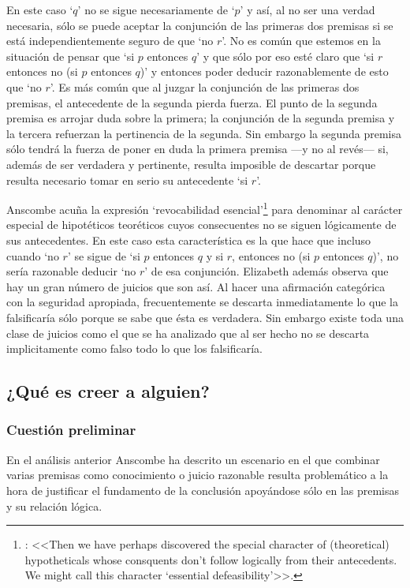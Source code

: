   En este caso `$q$' no se sigue necesariamente de `$p$' y así, al no ser una
  verdad necesaria, sólo se puede aceptar la conjunción de las primeras dos
  premisas si se está independientemente seguro de que `no $r$'. No es común que
  estemos en la situación de pensar que `si $p$ entonces $q$' y que sólo por eso
  esté claro que `si $r$ entonces no (si $p$ entonces $q$)' y entonces poder
  deducir razonablemente de esto que `no $r$'. Es más común que al juzgar la
  conjunción de las primeras dos premisas, el antecedente de la segunda pierda
  fuerza. El punto de la segunda premisa es arrojar duda sobre la primera; la
  conjunción de la segunda premisa y la tercera refuerzan la pertinencia de la
  segunda. Sin embargo la segunda premisa sólo tendrá la fuerza de poner en duda
  la primera premisa ---y no al revés--- si, además de ser verdadera y
  pertinente, resulta imposible de descartar porque resulta necesario tomar en
  serio su antecedente `si $r$'\autocite[Cf.~][301]{anscombe2015logic:qpa}.

  Anscombe acuña la expresión `revocabilidad
  esencial'\footnote{\cite[Cf.~][301]{anscombe2015logic:qpa}: <<Then we have
    perhaps discovered the special character of (theoretical) hypotheticals
    whose consquents don't follow logically from their antecedents. We might
    call this character `essential defeasibility'>>.} para denominar al carácter
  especial de hipotéticos teoréticos cuyos consecuentes no se siguen lógicamente
  de sus antecedentes. En este caso esta característica es la que hace que
  incluso cuando `no $r$' se sigue de `si $p$ entonces $q$ y si $r$, entonces no
  (si $p$ entonces $q$)', no sería razonable deducir `no $r$' de esa conjunción.
  Elizabeth además observa que hay un gran número de juicios que son así. Al
  hacer una afirmación categórica con la seguridad apropiada, frecuentemente se
  descarta inmediatamente lo que la falsificaría sólo porque se sabe que ésta es
  verdadera. Sin embargo existe toda una clase de juicios como el que se ha
  analizado que al ser hecho no se descarta implicitamente como falso todo lo
  que los falsificaría\autocite[Cf.~][302]{anscombe2015logic:qpa}.

\subsection{¿Qué es creer a alguien?}
\subsubsection{Cuestión preliminar}
En el análisis anterior Anscombe ha descrito un escenario en el que combinar
varias premisas como conocimiento o juicio razonable resulta problemático a la
hora de justificar el fundamento de la conclusión apoyándose sólo en las
premisas y su relación lógica.

